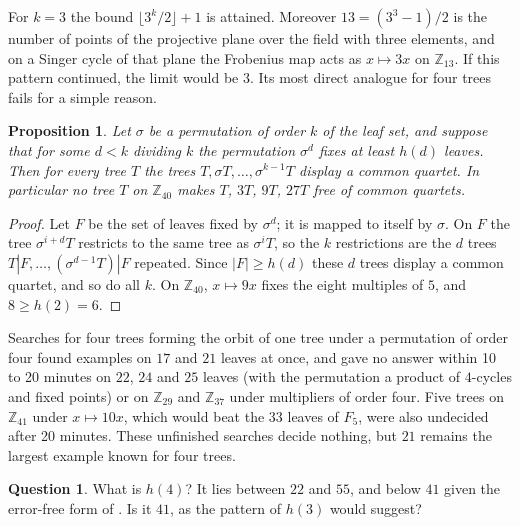 \documentclass[11pt]{amsart}
\newtheorem{proposition}[theorem]{Proposition}
\theoremstyle{definition}
\newtheorem{question}[theorem]{Question}
\begin{document}
For $k=3$ the bound $\lfloor3^k/2\rfloor+1$ is attained. Moreover $13=(3^3-1)/2$ is the number of points of the
projective plane over the field with three elements, and on a Singer cycle of that plane the Frobenius map acts as
$x\mapsto3x$ on $\mathbb{Z}_{13}$. If this pattern continued, the limit would be $3$. Its most direct analogue for
four trees fails for a simple reason.

\begin{proposition}\label{prop:power}
Let $\sigma$ be a permutation of order $k$ of the leaf set, and suppose that for some $d<k$ dividing $k$ the
permutation $\sigma^d$ fixes at least $h(d)$ leaves. Then for every tree $T$ the trees $T,\sigma T,\dots,
\sigma^{k-1}T$ display a common quartet. In particular no tree $T$ on $\mathbb{Z}_{40}$ makes $T$, $3T$, $9T$, $27T$
free of common quartets.
\end{proposition}

\begin{proof}
Let $F$ be the set of leaves fixed by $\sigma^d$; it is mapped to itself by $\sigma$. On $F$ the tree $\sigma^{i+d}T$
restricts to the same tree as $\sigma^iT$, so the $k$ restrictions are the $d$ trees $T|F,\dots,(\sigma^{d-1}T)|F$
repeated. Since $|F|\ge h(d)$ these $d$ trees display a common quartet, and so do all $k$. On $\mathbb{Z}_{40}$,
$x\mapsto9x$ fixes the eight multiples of $5$, and $8\ge h(2)=6$.
\end{proof}

Searches for four trees forming the orbit of one tree under a permutation of
order four found examples on $17$ and $21$ leaves at once, and gave no answer within 10 to 20 minutes on $22$, $24$
and $25$ leaves (with the permutation a product of $4$-cycles and fixed points) or on $\mathbb{Z}_{29}$ and
$\mathbb{Z}_{37}$ under multipliers of order four. Five trees on $\mathbb{Z}_{41}$ under $x\mapsto10x$, which would
beat the $33$ leaves of $F_5$, were also undecided after 20 minutes. These unfinished searches decide nothing, but
$21$ remains the largest example known for four trees.

\begin{question}\label{q:h4}
What is $h(4)$? It lies between $22$ and $55$, and below $41$ given the error-free form of \cite[Theorem~1.3]{SY}.
Is it $41$, as the pattern of $h(3)$ would suggest?
\end{question}
\end{document}
